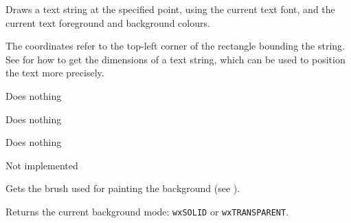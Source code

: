 Draws a text string at the specified point, using the current text font,
and the current text foreground and background colours.

The coordinates refer to the top-left corner of the rectangle bounding
the string. See  for how
to get the dimensions of a text string, which can be used to position the
text more precisely.



\label{wxdcenddoc}


Does nothing

\label{wxdcenddrawing}


Does nothing

\label{wxdcendpage}


Does nothing

\label{wxdcfloodfill}


Not implemented

\label{wxdcgetbackground}



Gets the brush used for painting the background (see ).

\label{wxdcgetbackgroundmode}


Returns the current background mode: {\tt wxSOLID} or {\tt wxTRANSPARENT}.



\label{wxdcgetbrush}



